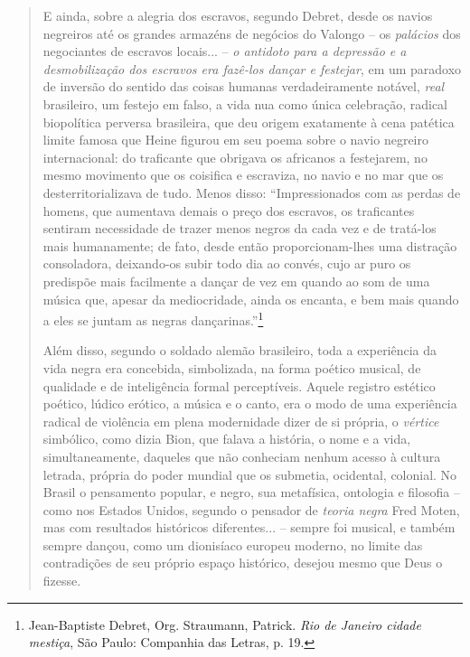 \begin{quote}
E ainda, sobre a alegria dos escravos, segundo Debret, desde os navios
negreiros até os grandes armazéns de negócios do Valongo -- os
\emph{palácios} dos negociantes de escravos locais...­ -- \emph{o
antidoto para a depressão e a desmobilização dos escravos era fazê-los
dançar e festejar}, em um paradoxo de inversão do sentido das coisas
humanas verdadeiramente notável, \emph{real} brasileiro, um festejo em
falso, a vida nua como única celebração, radical biopolítica perversa
brasileira, que deu origem exatamente à cena patética limite famosa que
Heine figurou em seu poema sobre o navio negreiro internacional: do
traficante que obrigava os africanos a festejarem, no mesmo movimento
que os coisifica e escraviza, no navio e no mar que os
desterritorializava de tudo. Menos disso: ``Impressionados com as perdas
de homens, que aumentava demais o preço dos escravos, os traficantes
sentiram necessidade de trazer menos negros da cada vez e de tratá-los
mais humanamente; de fato, desde então proporcionam-lhes uma distração
consoladora, deixando-os subir todo dia ao convés, cujo ar puro os
predispõe mais facilmente a dançar de vez em quando ao som de uma música
que, apesar da mediocridade, ainda os encanta, e bem mais quando a eles
se juntam as negras dançarinas.''\footnote{Jean-Baptiste Debret, Org.
  Straumann, Patrick. \emph{Rio de Janeiro cidade mestiça}, São Paulo:
  Companhia das Letras, p. 19.}

Além disso, segundo o soldado alemão brasileiro, toda a experiência da
vida negra era concebida, simbolizada, na forma poético musical, de
qualidade e de inteligência formal perceptíveis. Aquele registro
estético poético, lúdico erótico, a música e o canto, era o modo de uma
experiência radical de violência em plena modernidade dizer de si
própria, o \emph{vértice} simbólico, como dizia Bion, que falava a
história, o nome e a vida, simultaneamente, daqueles que não conheciam
nenhum acesso à cultura letrada, própria do poder mundial que os
submetia, ocidental, colonial. No Brasil o pensamento popular, e negro,
sua metafísica, ontologia e filosofia -- como nos Estados Unidos,
segundo o pensador de \emph{teoria negra} Fred Moten, mas com resultados
históricos diferentes... -- sempre foi musical, e também sempre dançou,
como um dionisíaco europeu moderno, no limite das contradições de seu
próprio espaço histórico, desejou mesmo que Deus o fizesse.


\end{quote}
